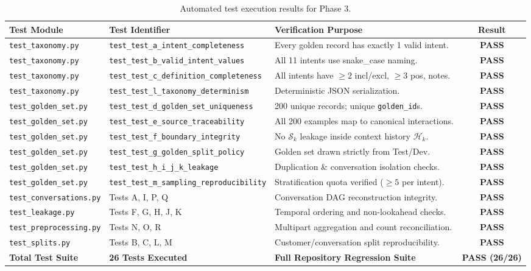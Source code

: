 \documentclass[11pt,a4paper]{article}
\begin{document}
\begin{table}[ht]
\centering
\small
\begin{tabularx}{\textwidth}{llp{7cm}c}
\toprule
\textbf{Test Module} & \textbf{Test Identifier} & \textbf{Verification Purpose} & \textbf{Result} \\
\midrule
\texttt{test\_taxonomy.py} & \texttt{test\_test\_a\_intent\_completeness} & Every golden record has exactly 1 valid intent. & \textbf{PASS} \\
\texttt{test\_taxonomy.py} & \texttt{test\_test\_b\_valid\_intent\_values} & All 11 intents use snake\_case naming. & \textbf{PASS} \\
\texttt{test\_taxonomy.py} & \texttt{test\_test\_c\_definition\_completeness} & All intents have $\ge 2$ incl/excl, $\ge 3$ pos, notes. & \textbf{PASS} \\
\texttt{test\_taxonomy.py} & \texttt{test\_test\_l\_taxonomy\_determinism} & Deterministic JSON serialization. & \textbf{PASS} \\
\texttt{test\_golden\_set.py} & \texttt{test\_test\_d\_golden\_set\_uniqueness} & 200 unique records; unique \texttt{golden\_id}s. & \textbf{PASS} \\
\texttt{test\_golden\_set.py} & \texttt{test\_test\_e\_source\_traceability} & All 200 examples map to canonical interactions. & \textbf{PASS} \\
\texttt{test\_golden\_set.py} & \texttt{test\_test\_f\_boundary\_integrity} & No $\mathcal{S}_k$ leakage inside context history $\mathcal{H}_k$. & \textbf{PASS} \\
\texttt{test\_golden\_set.py} & \texttt{test\_test\_g\_golden\_split\_policy} & Golden set drawn strictly from Test/Dev. & \textbf{PASS} \\
\texttt{test\_golden\_set.py} & \texttt{test\_test\_h\_i\_j\_k\_leakage} & Duplication \& conversation isolation checks. & \textbf{PASS} \\
\texttt{test\_golden\_set.py} & \texttt{test\_test\_m\_sampling\_reproducibility} & Stratification quota verified ($\ge 5$ per intent). & \textbf{PASS} \\
\texttt{test\_conversations.py} & Tests A, I, P, Q & Conversation DAG reconstruction integrity. & \textbf{PASS} \\
\texttt{test\_leakage.py} & Tests F, G, H, J, K & Temporal ordering and non-lookahead checks. & \textbf{PASS} \\
\texttt{test\_preprocessing.py} & Tests N, O, R & Multipart aggregation and count reconciliation. & \textbf{PASS} \\
\texttt{test\_splits.py} & Tests B, C, L, M & Customer/conversation split reproducibility. & \textbf{PASS} \\
\midrule
\textbf{Total Test Suite} & \textbf{26 Tests Executed} & \textbf{Full Repository Regression Suite} & \textbf{PASS (26/26)} \\
\bottomrule
\end{tabularx}
\caption{Automated test execution results for Phase 3.}
\label{tab:automated_tests}
\end{table}
\end{document}
